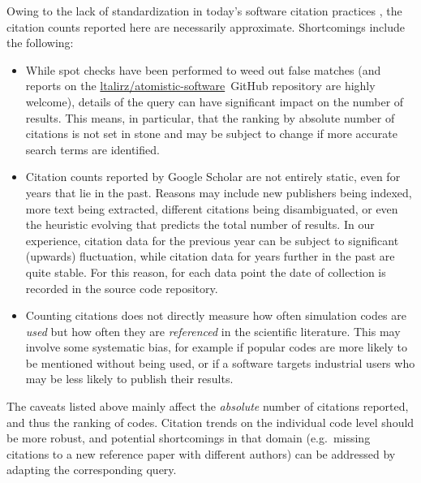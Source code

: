 \documentclass[9pt,review]{livecoms}
\newcommand{\atsoftgit}{\href{https://github.com/ltalirz/atomistic-software}{ltalirz/atomistic-software}\ }
\begin{document}
Owing to the lack of standardization in today's software citation practices \cite{vandeSandt2019,vandeSandt2020}, the citation counts reported here are necessarily approximate.
Shortcomings include the following:
\begin{itemize}
    \item While spot checks have been performed to weed out false matches (and reports on the \atsoftgit GitHub repository are highly welcome), details of the query can have significant impact on the number of results.
        This means, in particular, that the ranking by absolute number of citations is not set in stone and may be subject to change if more accurate search terms are identified. 
    \item Citation counts reported by Google Scholar are not entirely static, even for years that lie in the past. 
Reasons may include new publishers being indexed, more text being extracted, different citations being disambiguated, or even the heuristic evolving that predicts the total number of results. 
In our experience, citation data for the previous year can be subject to significant (upwards) fluctuation, while citation data for years further in the past are quite stable.
For this reason, for each data point the date of collection is recorded in the source code repository.
    \item Counting citations does not directly measure how often simulation codes are \emph{used} but how often they are \emph{referenced} in the scientific literature.
This may involve some systematic bias, for example if popular codes are more likely to be mentioned without being used,
or if a software targets industrial users who may be less likely to publish their results.
\end{itemize}

The caveats listed above mainly affect the \emph{absolute} number of citations reported, and thus the ranking of codes.
Citation trends on the individual code level should be more robust, and potential shortcomings in that domain (e.g.\ missing citations to a new reference paper with different authors) can be addressed by adapting the corresponding query.
\end{document}
